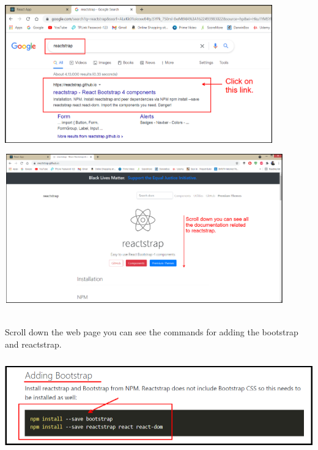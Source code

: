 \documentclass{article}
\begin{document}
\begin{center}
	\noindent \includegraphics*[width=4.56in, height=2.34in]{IMG-09-18}
\end{center}

\noindent 

\begin{center}
	\noindent \includegraphics*[width=4.75in, height=2.53in]{IMG-09-19}
\end{center}

\noindent 

\noindent \\
Scroll down the web page you can see the commands for adding the bootstrap and reactstrap.

\begin{center}
	\noindent \includegraphics*[width=6.13in, height=1.58in]{IMG-09-20}
\end{center}

\noindent 
\end{document}
